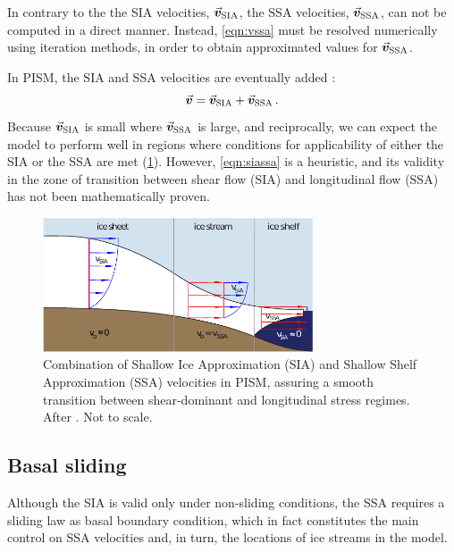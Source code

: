 \documentclass{article}
\newcommand{\vect}[1]{\va*{#1}} %
\newcommand{\vv}[0]{\vect{v}}           %
\newcommand{\vsia}[0]{\vv_{\mathrm{SIA}}}   %
\newcommand{\vssa}[0]{\vv_{\mathrm{SSA}}}   %
\begin{document}
In contrary to the the SIA velocities, $\vsia$, the SSA velocities, $\vssa$,
can not be computed in a direct manner. Instead, \cref{eqn:vssa} must be
resolved numerically using iteration methods, in order to obtain
approximated values for $\vssa$.

In PISM, the SIA and SSA velocities are eventually added
\citep[\cref{fig:model-siassa};][Eq.~15]{Winkelmann.etal.2011}:
\begin{equation}
    \label{eqn:siassa}
    \vv = \vsia + \vssa \,.
\end{equation}
Because $\vsia$ is small where $\vssa$ is large, and
reciprocally, we can expect the model to perform well in regions where
conditions for applicability of either the SIA or the SSA are met
(\cref{fig:model-siassa}). However,
\cref{eqn:siassa} is a heuristic, and its validity in the zone of
transition between shear flow (SIA) and longitudinal flow (SSA) has not been
mathematically proven.

\begin{figure}
  \centering
  \includegraphics[width=80mm]{model-siassa}
  \caption{Combination of Shallow Ice Approximation (SIA) and Shallow Shelf
           Approximation (SSA) velocities in PISM, assuring a smooth transition
           between shear-dominant and longitudinal stress regimes. After
           \citet[Fig.~1]{Winkelmann.etal.2011}. Not to scale.}
  \label{fig:model-siassa}
\end{figure}


\subsection{Basal sliding}

Although the SIA is valid only under non-sliding conditions, the SSA requires
a sliding law as basal boundary condition, which in fact constitutes the main
control on SSA velocities and, in turn, the locations of ice streams in the
model.
\end{document}
